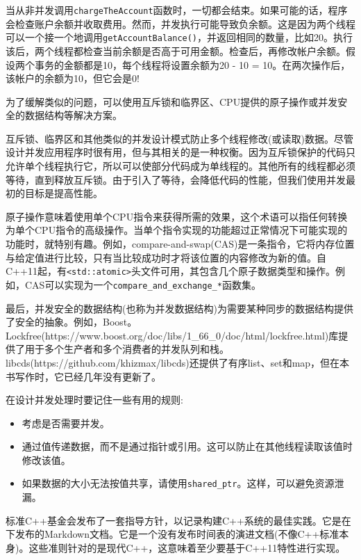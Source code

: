 当从非并发调用\texttt{chargeTheAccount}函数时，一切都会结束。如果可能的话，程序会检查账户余额并收取费用。然而，并发执行可能导致负余额。这是因为两个线程可以一个接一个地调用\texttt{getAccountBalance()}，并返回相同的数量，比如20。执行该后，两个线程都检查当前余额是否高于可用金额。检查后，再修改帐户余额。假设两个事务的金额都是10，每个线程将设置余额为20 - 10 = 10。在两次操作后，该帐户的余额为10，但它会是0!

为了缓解类似的问题，可以使用互斥锁和临界区、CPU提供的原子操作或并发安全的数据结构等解决方案。

互斥锁、临界区和其他类似的并发设计模式防止多个线程修改(或读取)数据。尽管设计并发应用程序时很有用，但与其相关的是一种权衡。因为互斥锁保护的代码只允许单个线程执行它，所以可以使部分代码成为单线程的。其他所有的线程都必须等待，直到释放互斥锁。由于引入了等待，会降低代码的性能，但我们使用并发最初的目标是提高性能。

原子操作意味着使用单个CPU指令来获得所需的效果，这个术语可以指任何转换为单个CPU指令的高级操作。当单个指令实现的功能超过正常情况下可能实现的功能时，就特别有趣。例如，compare-and-swap(CAS)是一条指令，它将内存位置与给定值进行比较，只有当比较成功时才将该位置的内容修改为新的值。自C++11起，有\texttt{<std::atomic>}头文件可用，其包含几个原子数据类型和操作。例如，CAS可以实现为一个\texttt{compare\_and\_exchange\_*}函数集。

最后，并发安全的数据结构(也称为并发数据结构)为需要某种同步的数据结构提供了安全的抽象。例如，Boost。Lockfree(https://www.boost.org/doc/libs/1\_66\_0/doc/html/lockfree.html)库提供了用于多个生产者和多个消费者的并发队列和栈。 libcds(https://github.com/khizmax/libcds)还提供了有序list、set和map，但在本书写作时，它已经几年没有更新了。

在设计并发处理时要记住一些有用的规则:

\begin{itemize}
\item 
考虑是否需要并发。

\item 
通过值传递数据，而不是通过指针或引用。这可以防止在其他线程读取该值时修改该值。

\item 
如果数据的大小无法按值共享，请使用\texttt{shared\_ptr}。这样，可以避免资源泄漏。
\end{itemize}


标准C++基金会发布了一套指导方针，以记录构建C++系统的最佳实践。它是在下发布的Markdown文档。它是一个没有发布时间表的演进文档(不像C++标准本身)。这些准则针对的是现代C++，这意味着至少要基于C++11特性进行实现。

